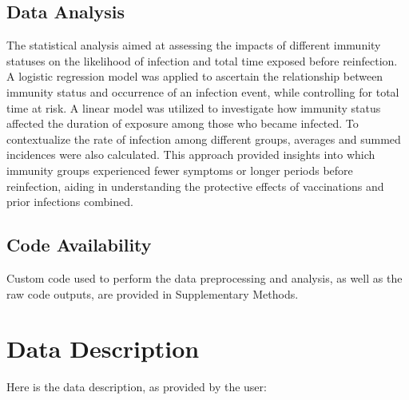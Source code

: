\documentclass[11pt]{article}
\begin{document}
\subsection*{Data Analysis}
The statistical analysis aimed at assessing the impacts of different immunity statuses on the likelihood of infection and total time exposed before reinfection. A logistic regression model was applied to ascertain the relationship between immunity status and occurrence of an infection event, while controlling for total time at risk. A linear model was utilized to investigate how immunity status affected the duration of exposure among those who became infected. To contextualize the rate of infection among different groups, averages and summed incidences were also calculated. This approach provided insights into which immunity groups experienced fewer symptoms or longer periods before reinfection, aiding in understanding the protective effects of vaccinations and prior infections combined.\subsection*{Code Availability}

Custom code used to perform the data preprocessing and analysis, as well as the raw code outputs, are provided in Supplementary Methods.






\clearpage
\appendix

\section{Data Description} \label{sec:data_description} Here is the data description, as provided by the user:
\end{document}
